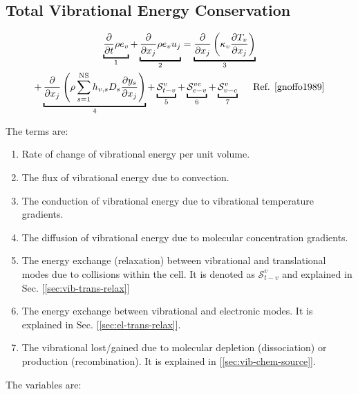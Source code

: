 \documentclass[10pt]{article}
\begin{document}
\begin{flushleft}
\subsection{Total Vibrational Energy Conservation}

\begin{multline}
    \ub{\pd{}{t} \rho e_v}{1} + \ub{\pd{}{x_j}\rho e_v u_j}{2} = \ub{\pd{}{x_j} \bp{\kappa_v \pd{T_v}{x_j}}}{3} \\ + \ub{\pd{}{x_j} \bp{\rho \sum_{s=1}^\text{NS} h_{v,s} D_s \pd{y_s}{x_j}}}{4} + \ub{\mathcal{S}_{t-v}^{v}}{5} + \ub{\mathcal{S}_{e-v}^{ve}}{6} + \ub{\mathcal{S}_{v-c}^{v}}{7} \hspace{5mm} \text{Ref. \cite{gnoffo1989}}
    \label{eq:cons_vib_energy}
\end{multline}

The terms are:

\begin{enumerate}
    \item Rate of change of vibrational energy per unit volume.
    \item The flux of vibrational energy due to convection.
    \item The conduction of vibrational energy due to vibrational temperature gradients.
    \item The diffusion of vibrational energy due to molecular concentration gradients.
    \item The energy exchange (relaxation) between vibrational and translational modes due to collisions within the cell. It is denoted as $\mathcal{S}_{t-v}^v$ and explained in Sec. [\ref{sec:vib-trans-relax}]
    \item The energy exchange between vibrational and electronic modes. It is explained in Sec. [\ref{sec:el-trans-relax}].
    \item The vibrational lost/gained due to molecular depletion (dissociation) or production (recombination). It is explained in [\ref{sec:vib-chem-source}].
\end{enumerate}

The variables are:


\end{flushleft}
\end{document}
